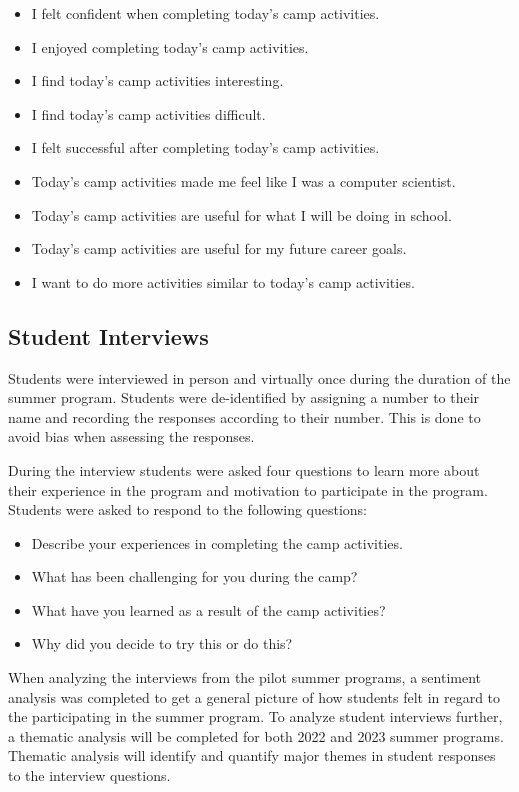 \documentclass[
]{article}
\providecommand{\tightlist}{%
  \setlength{\itemsep}{0pt}\setlength{\parskip}{0pt}}
\begin{document}
\begin{itemize}
\tightlist
\item
  I felt confident when completing today's camp activities.
\item
  I enjoyed completing today's camp activities.
\item
  I find today's camp activities interesting.
\item
  I find today's camp activities difficult.
\item
  I felt successful after completing today's camp activities.
\item
  Today's camp activities made me feel like I was a computer scientist.
\item
  Today's camp activities are useful for what I will be doing in school.
\item
  Today's camp activities are useful for my future career goals.
\item
  I want to do more activities similar to today's camp activities.
\end{itemize}

\hypertarget{student-interviews}{%
\subsection{Student Interviews}\label{student-interviews}}

Students were interviewed in person and virtually once during the
duration of the summer program. Students were de-identified by assigning
a number to their name and recording the responses according to their
number. This is done to avoid bias when assessing the responses.

During the interview students were asked four questions to learn more
about their experience in the program and motivation to participate in
the program. Students were asked to respond to the following questions:

\begin{itemize}
\tightlist
\item
  Describe your experiences in completing the camp activities.
\item
  What has been challenging for you during the camp?
\item
  What have you learned as a result of the camp activities?
\item
  Why did you decide to try this or do this?
\end{itemize}

When analyzing the interviews from the pilot summer programs, a
sentiment analysis was completed to get a general picture of how
students felt in regard to the participating in the summer program. To
analyze student interviews further, a thematic analysis will be
completed for both 2022 and 2023 summer programs. Thematic analysis will
identify and quantify major themes in student responses to the interview
questions.
\end{document}
